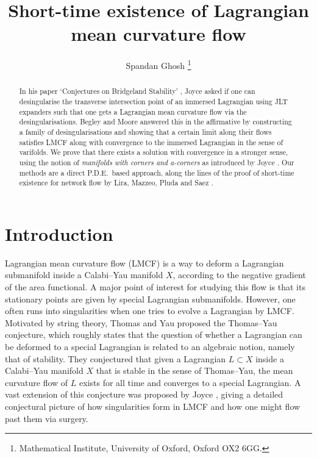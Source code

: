 \documentclass[10pt, a4paper]{article}
\date{}
\author{Spandan Ghosh 
	\footnote{ Mathematical Institute, University of Oxford, Oxford OX2 6GG. }
}
\title{
Short-time existence of Lagrangian mean curvature flow}
\theoremstyle{plain}%
\theoremstyle{definition}
\numberwithin{figure}{section}
\numberwithin{equation}{section}
\newcommand\freefootnote[1]{%
	\let\thefootnote\relax%
	\footnotetext{#1}%
	\let\thefootnote\svthefootnote%
}
\begin{document}
\maketitle
\begin{abstract}
In his paper `Conjectures on Bridgeland Stability' \cite{Joy15}, Joyce asked if one can desingularise the transverse intersection point of an immersed Lagrangian using JLT expanders such that one gets a Lagrangian mean curvature flow via the desingularisations. Begley and Moore \cite{BM16} answered this in the affirmative by constructing a family of desingularisations and showing that a certain limit along their flows satisfies LMCF along with convergence to the immersed Lagrangian in the sense of varifolds. We prove that there exists a solution with convergence in a stronger sense, using the notion of \textit{manifolds with corners and a-corners} as introduced by Joyce \cite{Joy16}. Our methods are a direct P.D.E.\ based approach, along the lines of the proof of short-time existence for network flow by Lira, Mazzeo, Pluda and Saez \cite{LMPS23}.
\end{abstract}
\freefootnote{E-mail: {\tt ghoshs@maths.ox.ac.uk}}
\tableofcontents




	
\section{Introduction}
Lagrangian mean curvature flow (LMCF) is a way to deform a Lagrangian submanifold inside a Calabi--Yau manifold $X$, according to the negative gradient of the area functional. A major point of interest for studying this flow is that its stationary points are given by special Lagrangian submanifolds. However, one often runs into singularities when one tries to evolve a Lagrangian by LMCF. Motivated by string theory, Thomas and Yau \cite{TY02} proposed the Thomas--Yau conjecture, which roughly states that the question of whether a Lagrangian can be deformed to a special Lagrangian is related to an algebraic notion, namely that of stability. They conjectured that given a Lagrangian $L\subset X$ inside a Calabi--Yau manifold $X$ that is stable in the sense of Thomas--Yau, the mean curvature flow of $L$ exists for all time and converges to a special Lagrangian. A vast extension of this conjecture was proposed by Joyce \cite{Joy15}, giving a detailed conjectural picture of how singularities form in LMCF and how one might flow past them via surgery. 
\end{document}

